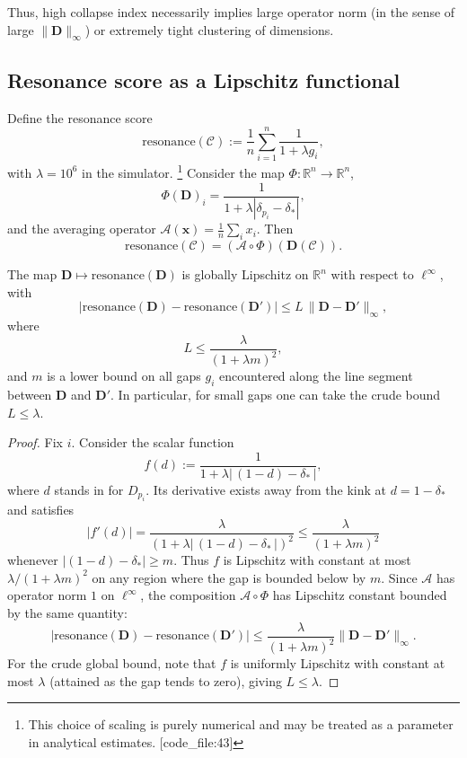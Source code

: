 \documentclass[11pt]{article}
\begin{document}
Thus, high collapse index necessarily implies large operator norm (in the sense of large \(\|\mathbf{D}\|_\infty\)) or extremely tight clustering of dimensions.

\subsection{Resonance score as a Lipschitz functional}

Define the resonance score
\[
  \mathrm{resonance}(\mathcal{C}) 
    := \frac{1}{n}\sum_{i=1}^n \frac{1}{1 + \lambda g_i},
\]
with \(\lambda = 10^6\) in the simulator.%
\footnote{This choice of scaling is purely numerical and may be treated as a parameter in analytical estimates. [code\_file:43]} 
Consider the map \(\Phi\colon \mathbb{R}^n \to \mathbb{R}^n\),
\[
  \Phi(\mathbf{D})_i = \frac{1}{1 + \lambda|\delta_{p_i} - \delta_\ast|},
\]
and the averaging operator \(\mathcal{A}(\mathbf{x}) = \frac{1}{n}\sum_i x_i\). Then
\[
  \mathrm{resonance}(\mathcal{C}) = (\mathcal{A}\circ\Phi)(\mathbf{D}(\mathcal{C})).
\]

\begin{lemma}
The map \(\mathbf{D}\mapsto \mathrm{resonance}(\mathbf{D})\) is globally Lipschitz on \(\mathbb{R}^n\) with respect to \(\ell^\infty\), with
\[
  \left|\mathrm{resonance}(\mathbf{D}) - \mathrm{resonance}(\mathbf{D}')\right|
  \le L \,\|\mathbf{D} - \mathbf{D}'\|_\infty,
\]
where 
\[
  L \le \frac{\lambda}{(1+\lambda m)^2},
\]
and \(m\) is a lower bound on all gaps \(g_i\) encountered along the line segment between \(\mathbf{D}\) and \(\mathbf{D}'\). In particular, for small gaps one can take the crude bound \(L \le \lambda\).
\end{lemma}

\begin{proof}
Fix \(i\). Consider the scalar function
\[
  f(d) := \frac{1}{1 + \lambda|\,(1-d) - \delta_\ast\,|},
\]
where \(d\) stands in for \(D_{p_i}\). Its derivative exists away from the kink at \(d = 1 - \delta_\ast\) and satisfies
\[
  |f'(d)| = \frac{\lambda}{(1 + \lambda|\, (1-d) - \delta_\ast\,|)^2}
  \le \frac{\lambda}{(1+\lambda m)^2}
\]
whenever \(|(1-d) - \delta_\ast|\ge m\). Thus \(f\) is Lipschitz with constant at most \(\lambda/(1+\lambda m)^2\) on any region where the gap is bounded below by \(m\). Since \(\mathcal{A}\) has operator norm \(1\) on \(\ell^\infty\), the composition \(\mathcal{A}\circ\Phi\) has Lipschitz constant bounded by the same quantity:
\[
  \left|\mathrm{resonance}(\mathbf{D}) - \mathrm{resonance}(\mathbf{D}')\right|
  \le \frac{\lambda}{(1+\lambda m)^2} \|\mathbf{D} - \mathbf{D}'\|_\infty.
\]
For the crude global bound, note that \(f\) is uniformly Lipschitz with constant at most \(\lambda\) (attained as the gap tends to zero), giving \(L\le \lambda\).
\end{proof}
\end{document}
